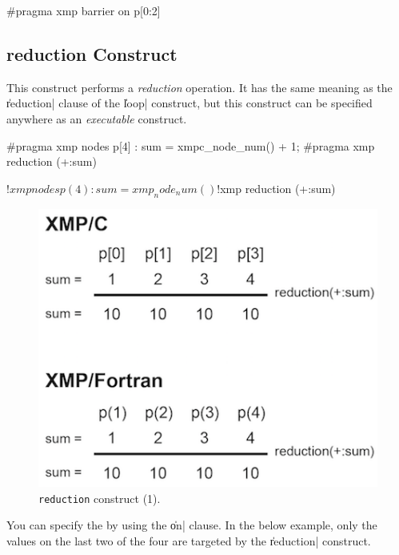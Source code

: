 \begin{XCexample}
#pragma xmp barrier on p[0:2]
\end{XCexample}



\subsection{{\bf reduction} Construct}

This construct performs a {\it reduction} operation. It has the same
meaning as the \|reduction| clause of the \|loop| construct, but this
construct can be specified anywhere as an {\it executable} construct.

\begin{XCexample}
#pragma xmp nodes p[4]
  :
sum = xmpc_node_num() + 1;
#pragma xmp reduction (+:sum)
\end{XCexample}

\begin{XFexample}
!$xmp nodes p(4)
  :
sum = xmp_node_num()
!$xmp reduction (+:sum)
\end{XFexample}

\begin{figure}
  \centering
  \includegraphics{figs/reduction.png}
  \caption{{\tt reduction} construct (1).}
\end{figure}

You can specify the {\enset} by using the \|on| clause. In the
below example, only the values on the last two of the four {\nodes} are
targeted by the \|reduction| construct.

